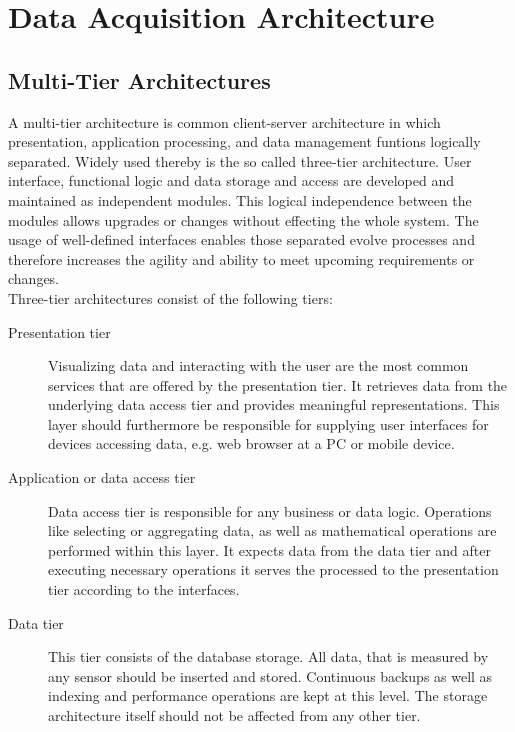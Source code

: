 \section{Data Acquisition Architecture}
\subsection{Multi-Tier Architectures}
A multi-tier architecture is common client-server architecture in which presentation, application processing, and data management funtions logically separated. Widely used thereby is the so called three-tier architecture. User interface, functional logic and data storage and access are developed and maintained as independent modules. This logical independence between the modules allows upgrades or changes without effecting the whole system. The usage of well-defined interfaces enables those separated evolve processes and therefore increases the agility and ability to meet upcoming requirements or changes.\\

Three-tier architectures consist of the following tiers:
 \begin{description}
     \item[Presentation tier] Visualizing data and interacting with the user are the most common services that are offered by the presentation tier. It retrieves data from the underlying data access tier and provides meaningful representations. This layer should furthermore be responsible for supplying user interfaces for devices accessing data, e.g. web browser at a PC or mobile device.
     \item[Application or data access tier] Data access tier is responsible for any business or data logic. Operations like selecting or aggregating data, as well as mathematical operations are performed within this layer. It expects data from the data tier and after executing necessary operations it serves the processed to the presentation tier according to the interfaces.
     \item[Data tier] This tier consists of the database storage. All data, that is measured by any sensor should be inserted and stored. Continuous backups as well as indexing and performance operations are kept at this level. The storage architecture itself should not be affected from any other tier.
  \end{description}
  
